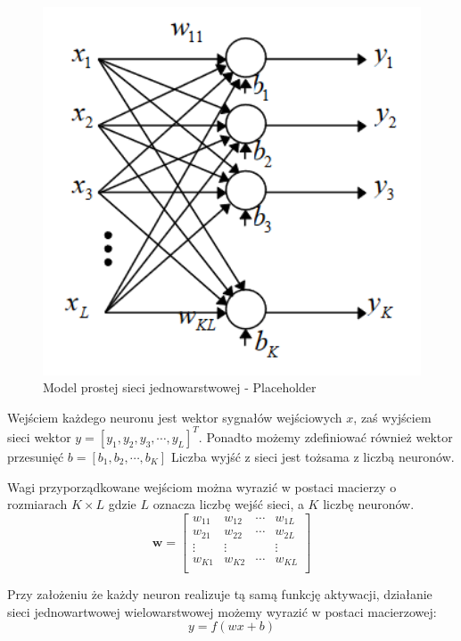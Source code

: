 \documentclass[12pt,twoside]{article}
\begin{document}
\begin{figure}[ht]
	\centering
	\includegraphics[width=12cm]{figures/models/singleLayerModel.png}
	\caption{Model prostej sieci jednowarstwowej - Placeholder}
	\label{Fig:singleNetwork}
\end{figure}

Wejściem każdego neuronu jest wektor sygnałów wejściowych $x$, zaś wyjściem sieci wektor $y = \left[ y_1, y_2, y_3, \cdots, y_L \right]^T$.
Ponadto możemy zdefiniować również wektor przesunięć $b = \left[ b_1, b_2, \cdots, b_K \right]$
Liczba wyjść z sieci jest tożsama z liczbą neuronów.

Wagi przyporządkowane wejściom można wyrazić w postaci macierzy o rozmiarach $K \times L$ gdzie $L$ oznacza liczbę wejść sieci, a $K$ liczbę neuronów.
$$\bm{w} = \left[
	\begin{array}{cccc}
		w_{11} & w_{12} & \cdots & w_{1L} \\
		w_{21} & w_{22} & \cdots & w_{2L} \\
		\vdots & \vdots &  & \vdots \\
		w_{K1} & w_{K2} & \cdots & w_{KL} \\
	\end{array}
	\right]$$

Przy założeniu że każdy neuron realizuje tą samą funkcję aktywacji, działanie sieci jednowartwowej wielowarstwowej możemy wyrazić w postaci macierzowej:
\begin{equation}
	\label{eq:singleLayerOut}
	y = f\left( wx + b \right)
\end{equation}
\end{document}
